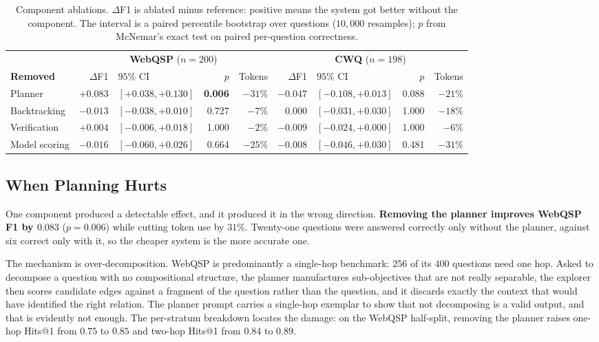 \begin{table}[!tb]
  \begin{center}
        \caption{Component ablations. $\Delta$F1 is ablated minus reference:
      positive means the system got better without the component. The
      interval is a paired percentile bootstrap over questions
      ($10{,}000$ resamples); $p$ from McNemar's exact test on paired
      per-question correctness.}
    \label{tab:ablation}
    \scriptsize
    \setlength{\tabcolsep}{2.5pt}
    \begin{tabular}{|l|rlrr|rlrr|}
      \hline
      & \multicolumn{4}{c|}{\textbf{WebQSP} ($n=200$)}
      & \multicolumn{4}{c|}{\textbf{CWQ} ($n=198$)} \\
      \textbf{Removed} & $\Delta$F1 & $95\%$ CI & $p$ & Tokens
                       & $\Delta$F1 & $95\%$ CI & $p$ & Tokens \\
      \hline
      Planner        & $+0.083$ & $[+0.038, +0.130]$ & \textbf{0.006} & $-31\%$
                     & $-0.047$ & $[-0.108, +0.013]$ & 0.088 & $-21\%$ \\
      Backtracking   & $-0.013$ & $[-0.038, +0.010]$ & 0.727 & $-7\%$
                     & $0.000$  & $[-0.031, +0.030]$ & 1.000 & $-18\%$ \\
      Verification   & $+0.004$ & $[-0.006, +0.018]$ & 1.000 & $-2\%$
                     & $-0.009$ & $[-0.024, +0.000]$ & 1.000 & $-6\%$ \\
      Model scoring  & $-0.016$ & $[-0.060, +0.026]$ & 0.664 & $-25\%$
                     & $-0.008$ & $[-0.046, +0.030]$ & 0.481 & $-31\%$ \\
      \hline
    \end{tabular}
  \end{center}
\end{table}

\subsection{When Planning Hurts}\label{sec:planner}

One component produced a detectable effect, and it produced it in the
wrong direction. \textbf{Removing the planner improves WebQSP F1 by
$0.083$} ($p = 0.006$) while cutting token use by $31\%$. Twenty-one
questions were answered correctly only without the planner, against six
correct only with it, so the cheaper system is the more accurate one.

The mechanism is over-decomposition. WebQSP is predominantly a
single-hop benchmark: $256$ of its $400$ questions need one hop. Asked
to decompose a question with no compositional structure, the planner
manufactures sub-objectives that are not really separable, the explorer
then scores candidate edges against a fragment of the question rather
than the question, and it discards exactly the context that would have
identified the right relation. The planner prompt carries a single-hop
exemplar to show that not decomposing is a valid output, and that is
evidently not enough. The per-stratum breakdown locates the damage: on
the WebQSP half-split, removing the planner raises one-hop Hits@1 from
$0.75$ to $0.85$ and two-hop Hits@1 from $0.84$ to $0.89$.

